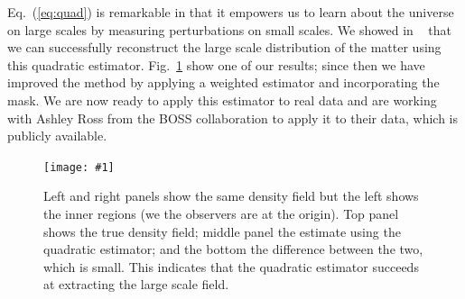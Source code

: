\documentclass[12pt]{article}
\newcommand{\sfig}[2]{
\begin{center}
\texttt{[image: \#1]}
\end{center}
        }
\newcommand{\Sfig}[2]{
    \begin{figure}[!h]
    \sfig{./#1.pdf}{.9\columnwidth}
    \caption{{\small #2}}
    \label{fig:#1}
    \end{figure}
}
\newcommand{\rf}[1]{\ref{fig:#1}}
\newcommand{\ec}[1]{Eq.~(\ref{eq:#1})}
\begin{document}
\begin{small}
\ec{quad} is remarkable in that it empowers us to learn about the universe on large scales by measuring perturbations on small scales. We showed in ~\cite{Li:2020uug,Li:2020luq} that we can successfully reconstruct the large scale distribution of the matter using this quadratic estimator. Fig.~\rf{cube_dm} show one of our results; since then we have improved the method by applying a weighted estimator and incorporating the mask. We are now ready to apply this estimator to real data and are working with Ashley Ross from the BOSS collaboration to apply it to their data, which is publicly available. 


\Sfig{cube_dm}{Left and right panels show the same density field but the left shows the inner regions (we the observers are at the origin). Top panel shows the true density field; middle panel the estimate using the quadratic estimator; and the bottom the difference between the two, which is small. This indicates that the quadratic estimator succeeds at extracting the large scale field.}

\end{small}
\end{document}
